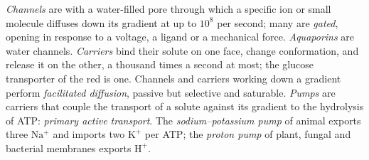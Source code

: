\begin{definition}\label{def:b1:membranes-transport:transporters}
\emph{Channels} are  with a
water-filled pore through which a specific ion or small molecule
diffuses down its gradient at up to $10^8$ per second; many are
\emph{gated}, opening in response to a voltage, a ligand or a
mechanical force. \emph{Aquaporins} are water
channels. \emph{Carriers} bind their solute on one face,
change conformation, and release it on the other, a thousand times a
second at most; the glucose transporter of the red  is one.
Channels and carriers working down a gradient perform \emph{facilitated
diffusion}, passive but selective and
saturable. \emph{Pumps} are carriers that couple the
transport of a solute against its gradient to the hydrolysis of ATP:
\emph{primary active transport}. The
\emph{sodium--potassium pump} of animal
 exports three $\mathrm{Na^+}$ and imports two $\mathrm{K^+}$ per
ATP; the \emph{proton pump} of plant, fungal and bacterial membranes
exports $\mathrm{H^+}$.
\end{definition}

